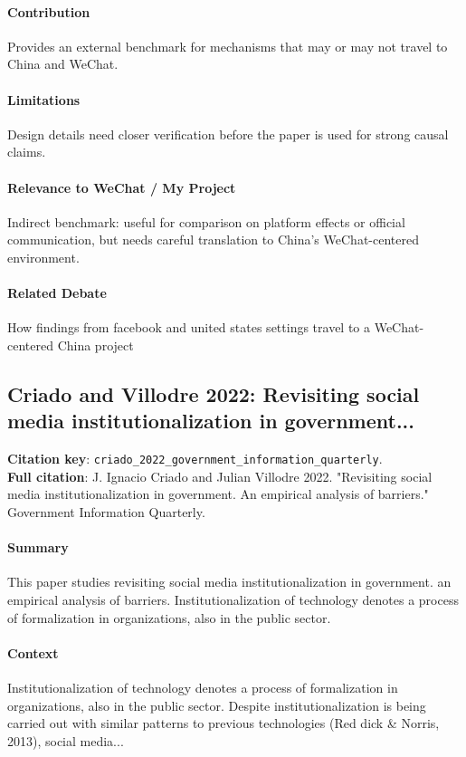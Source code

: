 \documentclass[12pt]{article}
\begin{document}
\paragraph{Contribution} Provides an external benchmark for mechanisms that may or may not travel to China and WeChat.

\paragraph{Limitations} Design details need closer verification before the paper is used for strong causal claims.

\paragraph{Relevance to WeChat / My Project} Indirect benchmark: useful for comparison on platform effects or official communication, but needs careful translation to China's WeChat-centered environment.

\paragraph{Related Debate} How findings from facebook and united states settings travel to a WeChat-centered China project


\subsection{Criado and Villodre 2022: Revisiting social media institutionalization in government...}
\textbf{Citation key}: \texttt{criado\_2022\_government\_information\_quarterly}.\\
\textbf{Full citation}: J. Ignacio Criado and Julian Villodre 2022. "Revisiting social media institutionalization in government. An empirical analysis of barriers." Government Information Quarterly.

\paragraph{Summary} This paper studies revisiting social media institutionalization in government. an empirical analysis of barriers. Institutionalization of technology denotes a process of formalization in organizations, also in the public sector.

\paragraph{Context} Institutionalization of technology denotes a process of formalization in organizations, also in the public sector. Despite institutionalization is being carried out with similar patterns to previous technologies (Red dick \& Norris, 2013), social media...
\end{document}
